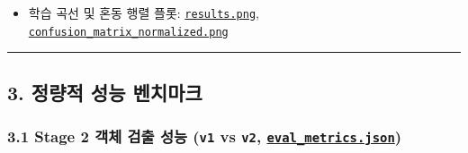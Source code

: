 \documentclass[10.5pt,a4paper]{article}
\begin{document}
\begin{itemize}[leftmargin=1.5em,itemsep=2pt]
\item 학습 곡선 및 혼동 행렬 플롯: \href{https://github.com/Heisnotanimposter/Totalcare\_autonomous\_driving\_Yolov5/blob/main/results/v2\_improved/outputs/train\_results/results.png}{\texttt{results.\allowbreak{}png}}, \href{https://github.com/Heisnotanimposter/Totalcare\_autonomous\_driving\_Yolov5/blob/main/results/v2\_improved/outputs/train\_results/confusion\_matrix\_normalized.png}{\texttt{confusion\_\allowbreak{}matrix\_\allowbreak{}normalized.\allowbreak{}png}}
\end{itemize}

\par\noindent\rule{\textwidth}{0.4pt}\par\medskip

\subsection{3. 정량적 성능 벤치마크}

\subsubsection{3.1 Stage 2 객체 검출 성능 (\texttt{v1} vs \texttt{v2}, \href{https://github.com/Heisnotanimposter/Totalcare\_autonomous\_driving\_Yolov5/blob/main/results/v2\_improved/outputs/eval\_metrics.json}{\texttt{eval\_\allowbreak{}metrics.\allowbreak{}json}})}
\end{document}
